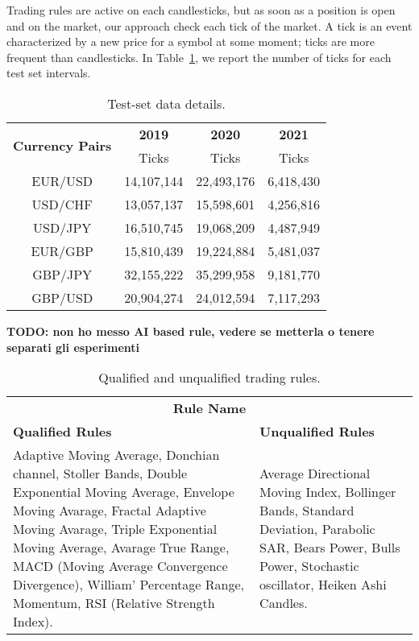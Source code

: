 Trading rules are active on each candlesticks, but as soon as a position is open and on the market, our approach check each tick of the market. A tick is an event characterized by a new price for a symbol at some moment; ticks are more frequent than candlesticks. In Table~\ref{tab:ticks}, we report the number of ticks for each test set intervals.

 \begin{table}[h!]
    \caption{Test-set data details.}
  \begin{center} 
    \label{tab:ticks}
    \begin{tabular}{c c c c }
    \hline
    \multirow{2}{*}{\centering \textbf{Currency Pairs}} &  \textbf{2019}  &  \textbf{2020}&  \textbf{2021}\\\cline{2-4} %
         & Ticks  & Ticks  & Ticks\\ %
      \hline
        EUR/USD   & 14,107,144   & 22,493,176  & 6,418,430\\
        USD/CHF     & 13,057,137   & 15,598,601  & 4,256,816\\
        USD/JPY    & 16,510,745  & 19,068,209   & 4,487,949\\
        EUR/GBP    &  15,810,439 & 19,224,884  & 5,481,037\\
        GBP/JPY   &  32,155,222 & 35,299,958  & 9,181,770\\
        GBP/USD    & 20,904,274  & 24,012,594  & 7,117,293\\
	\hline
    \end{tabular}
  \end{center}
\end{table}


\textbf{TODO: non ho messo AI based rule, vedere se metterla o tenere separati gli esperimenti}
\begin{table}[h!]
  \begin{center} 
    \caption{Qualified and unqualified trading rules.}
    \label{tab:qualrules}
    \begin{tabular}{p{6cm}  p{6cm} }
    \hline
    \multicolumn{2}{c}{\textbf{Rule Name}}
    \\\cline{1-2}
    \textbf{Qualified Rules} & \textbf{Unqualified Rules}\\
    \hline
    Adaptive Moving Average, Donchian channel, Stoller Bands,  Double Exponential Moving Average, Envelope Moving Avarage,  Fractal Adaptive Moving Avarage, Triple Exponential Moving Average, Avarage True Range,  MACD (Moving Average Convergence Divergence),  William' Percentage Range, Momentum, RSI (Relative Strength Index). 
    &
    Average Directional Moving Index, Bollinger Bands, Standard Deviation, Parabolic SAR, Bears Power, Bulls Power, Stochastic oscillator, Heiken Ashi Candles.\\
      \hline
    \end{tabular}
  \end{center}
\end{table}


